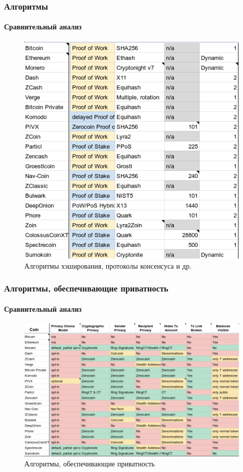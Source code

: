 \documentclass{beamer}
\begin{document}
\begin{frame}
    \frametitle{Алгоритмы}
    \framesubtitle{Сравнительный анализ}
    \begin{figure}
        \includegraphics[width=0.6\columnwidth]{sravn2.png}
        \caption{Алгоритмы хэширования, протоколы консенсуса и др.}
    \end{figure}
\end{frame}

\begin{frame}
    \frametitle{Алгоритмы, обеспечивающие приватность}
    \framesubtitle{Сравнительный анализ}
    \begin{figure}
        \includegraphics[width=\columnwidth]{sravn3.png}
        \caption{Алгоритмы, обеспечивающие приватность}
    \end{figure}
\end{frame}
\end{document}
